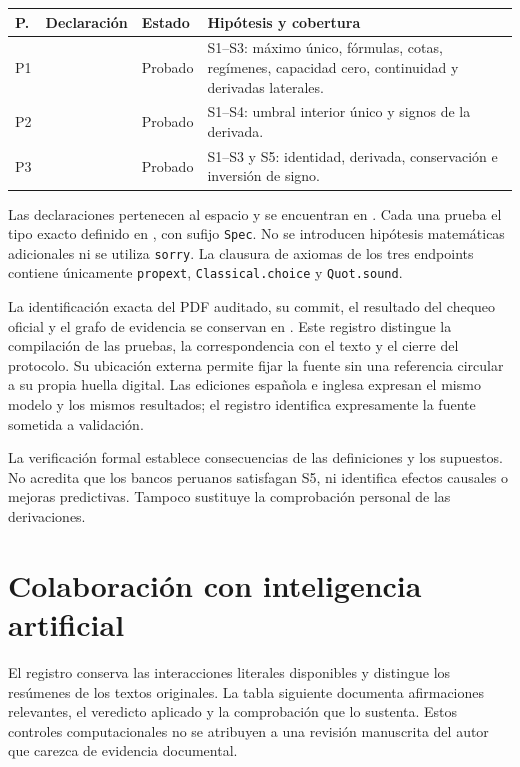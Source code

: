 \documentclass[11pt]{article}
\theoremstyle{definition}\newtheorem{assumption}{Supuesto}
\begin{document}
\begin{center}\small
\begin{tabular}{L{.06\linewidth}L{.21\linewidth}L{.15\linewidth}L{.47\linewidth}}
\toprule P. & Declaración & Estado & Hipótesis y cobertura\\\midrule
P1 &  & Probado & S1--S3: máximo único, fórmulas, cotas, regímenes, capacidad cero, continuidad y derivadas laterales.\\
P2 &  & Probado & S1--S4: umbral interior único y signos de la derivada.\\
P3 &  & Probado & S1--S3 y S5: identidad, derivada, conservación e inversión de signo.\\
\bottomrule\end{tabular}
\end{center}
Las declaraciones pertenecen al espacio  y se
encuentran en . Cada una prueba el tipo exacto
definido en , con sufijo \texttt{Spec}. No se
introducen hipótesis matemáticas adicionales ni se utiliza \texttt{sorry}.
La clausura de axiomas de los tres endpoints contiene únicamente
\texttt{propext}, \texttt{Classical.choice} y \texttt{Quot.sound}.

La identificación exacta del PDF auditado, su commit, el resultado del
chequeo oficial y el grafo de evidencia se conservan en
\href{https://github.com/fgalarzac/ai-project/blob/main/docs/lean_progreso.md}{}.
Este registro distingue la compilación de las pruebas, la correspondencia
con el texto y el cierre del protocolo. Su ubicación externa permite fijar
la fuente sin una referencia circular a su propia huella digital. Las
ediciones española e inglesa expresan el mismo modelo y los mismos resultados;
el registro identifica expresamente la fuente sometida a validación.

La verificación formal establece consecuencias de las definiciones y los
supuestos. No acredita que los bancos peruanos satisfagan S5, ni identifica
efectos causales o mejoras predictivas. Tampoco sustituye la comprobación
personal de las derivaciones.

\clearpage
\section{Colaboración con inteligencia artificial}
El registro  conserva las interacciones literales disponibles
y distingue los resúmenes de los textos originales. La tabla siguiente
documenta afirmaciones relevantes, el veredicto aplicado y la comprobación
que lo sustenta. Estos controles computacionales no se atribuyen a una
revisión manuscrita del autor que carezca de evidencia documental.
\end{document}
